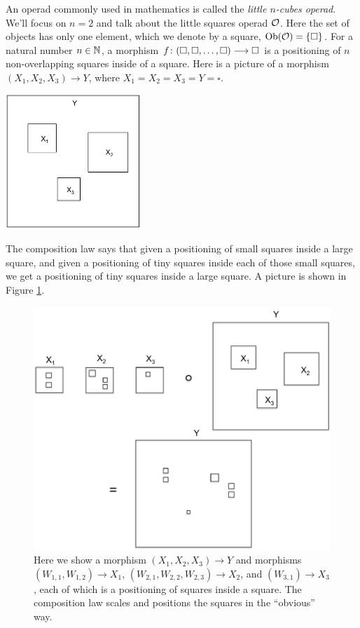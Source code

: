 \begin{example}\label{ex:little squares}

An operad commonly used in mathematics is called the {\em little $n$-cubes operad}. We'll focus on $n=2$ and talk about the little squares operad $\mathcal{O}$. Here the set of objects has only one element, which we denote by a square, $\textnormal{Ob}(\mathcal{O})=\{\square\}$. For a natural number $n\in{\mathbb N}$, a morphism $f\colon(\square,\square,\ldots,\square)\longrightarrow\square$ is a positioning of $n$ non-overlapping squares inside of a square. Here is a picture of a morphism $(X_1,X_2,X_3)\to Y$, where $X_1=X_2=X_3=Y=\square$.
\begin{center}
\includegraphics[height=2in]{square1}
\end{center}
The composition law says that given a positioning of small squares inside a large square, and given a positioning of tiny squares inside each of those small squares, we get a positioning of tiny squares inside a large square. A picture is shown in Figure \ref{fig:composition law for squares}.
\begin{figure}[H]
\begin{center}
\includegraphics[width=\textwidth]{square2}
\end{center}
\caption{Here we show a morphism $(X_1,X_2,X_3)\to Y$ and morphisms $(W_{1,1},W_{1,2})\to X_1$, $(W_{2,1},W_{2,2},W_{2,3})\to X_2$, and $(W_{3,1})\to X_3$, each of which is a positioning of squares inside a square. The composition law scales and positions the squares in the “obvious” way.}
\label{fig:composition law for squares}
\end{figure}


\end{example}
